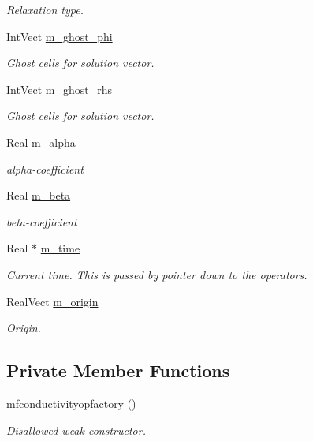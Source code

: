 \begin{DoxyCompactItemize}
\begin{DoxyCompactList}\small\item\em Relaxation type. \end{DoxyCompactList}\item 
Int\+Vect \hyperlink{classmfconductivityopfactory_a4356fa0bb3aaa681629b5fdef69e9054}{m\+\_\+ghost\+\_\+phi}
\begin{DoxyCompactList}\small\item\em Ghost cells for solution vector. \end{DoxyCompactList}\item 
Int\+Vect \hyperlink{classmfconductivityopfactory_a6e9283af244c45b42b084f3e9a3466b7}{m\+\_\+ghost\+\_\+rhs}
\begin{DoxyCompactList}\small\item\em Ghost cells for solution vector. \end{DoxyCompactList}\item 
Real \hyperlink{classmfconductivityopfactory_a7c2c3e472b0fe6f02c91426f7ddc457b}{m\+\_\+alpha}
\begin{DoxyCompactList}\small\item\em alpha-\/coefficient \end{DoxyCompactList}\item 
Real \hyperlink{classmfconductivityopfactory_a84e9034b87544fd055c7568f69e6e1d6}{m\+\_\+beta}
\begin{DoxyCompactList}\small\item\em beta-\/coefficient \end{DoxyCompactList}\item 
Real $\ast$ \hyperlink{classmfconductivityopfactory_a975314e1a2dd2c8c48b56f9cebf68ac8}{m\+\_\+time}
\begin{DoxyCompactList}\small\item\em Current time. This is passed by pointer down to the operators. \end{DoxyCompactList}\item 
Real\+Vect \hyperlink{classmfconductivityopfactory_a72dd438f1ac2b40b515406bccea4446c}{m\+\_\+origin}
\begin{DoxyCompactList}\small\item\em Origin. \end{DoxyCompactList}\end{DoxyCompactItemize}
\subsection*{Private Member Functions}
\begin{DoxyCompactItemize}
\item 
\hyperlink{classmfconductivityopfactory_adb540c809990c257a1edd54edeb1b802}{mfconductivityopfactory} ()
\begin{DoxyCompactList}\small\item\em Disallowed weak constructor. \end{DoxyCompactList}\end{DoxyCompactItemize}


